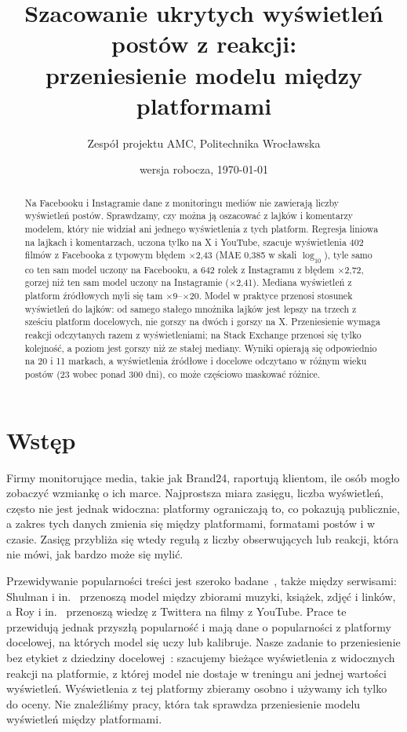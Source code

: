 \documentclass[10pt,a4paper]{article}
\title{Szacowanie ukrytych wyświetleń postów z reakcji:\\przeniesienie modelu między platformami}
\author{Zespół projektu AMC, Politechnika Wrocławska}
\date{wersja robocza, \today}
\newcommand{\x}[1]{$\times$#1}
\begin{document}
\maketitle

\begin{abstract}
Na Facebooku i Instagramie dane z monitoringu mediów nie zawierają liczby wyświetleń postów. Sprawdzamy, czy można ją
oszacować z lajków i komentarzy modelem, który nie widział ani jednego wyświetlenia z tych platform. Regresja liniowa na
lajkach i komentarzach, uczona tylko na X i YouTube, szacuje wyświetlenia 402 filmów z Facebooka z typowym błędem
\x{2,43} (MAE 0,385 w skali $\log_{10}$), tyle samo co ten sam model uczony na Facebooku, a 642 rolek z Instagramu
z błędem \x{2,72}, gorzej niż ten sam model uczony na Instagramie (\x{2,41}). Mediana wyświetleń z platform
źródłowych myli się tam \x{9}--\x{20}. Model w praktyce przenosi stosunek wyświetleń do lajków: od samego stałego
mnożnika lajków jest lepszy na trzech z sześciu platform docelowych, nie gorszy na dwóch i gorszy na X. Przeniesienie
wymaga reakcji odczytanych razem z wyświetleniami; na Stack Exchange przenosi się tylko kolejność, a poziom jest gorszy
niż ze stałej mediany. Wyniki opierają się odpowiednio na 20 i 11 markach, a wyświetlenia źródłowe i docelowe odczytano
w różnym wieku postów (23 wobec ponad 300 dni), co może częściowo maskować różnice.
\end{abstract}


\section{Wstęp}

Firmy monitorujące media, takie jak Brand24, raportują klientom, ile osób mogło zobaczyć wzmiankę o ich marce.
Najprostsza miara zasięgu, liczba wyświetleń, często nie jest jednak widoczna: platformy ograniczają to, co pokazują
publicznie, a zakres tych danych zmienia się między platformami, formatami postów i w czasie. Zasięg przybliża się
wtedy regułą z liczby obserwujących lub reakcji, która nie mówi, jak bardzo może się mylić.

Przewidywanie popularności treści jest szeroko badane~\cite{tatar2014}, także między serwisami:
Shulman i in.~\cite{shulman2016} przenoszą model między zbiorami muzyki, książek, zdjęć i linków, a Roy
i in.~\cite{roy2013} przenoszą wiedzę z Twittera na filmy z YouTube. Prace te przewidują jednak przyszłą popularność
i mają dane o popularności z platformy docelowej, na których model się uczy lub kalibruje. Nasze zadanie to
przeniesienie bez etykiet z dziedziny docelowej~\cite{bendavid2010}: szacujemy bieżące wyświetlenia z widocznych
reakcji na platformie, z której model nie dostaje w treningu ani jednej wartości wyświetleń. Wyświetlenia z tej
platformy zbieramy osobno i używamy ich tylko do oceny. Nie znaleźliśmy pracy, która tak sprawdza przeniesienie modelu
wyświetleń między platformami.
\end{document}
